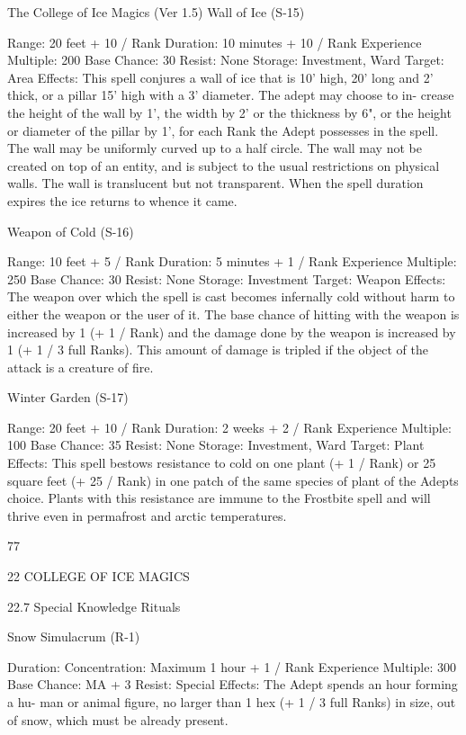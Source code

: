 \begin{Chapter}{The College of Ice Magics (Ver 1.5)}
Wall of Ice (S-15) 

Range: 20 feet + 10 / Rank 
Duration: 10 minutes + 10 / Rank 
Experience Multiple: 200 
Base Chance: 30%
Resist: None 
Storage: Investment, Ward 
Target: Area 
Effects: This spell conjures a wall of ice that is 10’ 
high,  20’  long  and  2’  thick,  or  a  pillar  15’  high 
with  a  3’  diameter.  The  adept  may  choose  to  in-
crease the height of the wall by 1’, the width by 2’ 
or the thickness by 6", or the height or diameter of 
the pillar by 1’, for each Rank the Adept possesses 
in the spell. The wall may be uniformly curved up 
to a half circle. The wall may not be created on top 
of an entity, and is subject to the usual restrictions 
on  physical  walls.  The  wall  is  translucent  but  not 
transparent. When the spell duration expires the ice 
returns to whence it came. 

Weapon of Cold (S-16) 

Range: 10 feet + 5 / Rank 
Duration: 5 minutes + 1 / Rank 
Experience Multiple: 250 
Base Chance: 30%
Resist: None 
Storage: Investment 
Target: Weapon 
Effects:  The  weapon  over  which  the  spell  is  cast 
becomes infernally cold without harm to either the 
weapon or the user of it. The base chance of hitting 
with the weapon is increased by 1 (+ 1 / Rank) and 
the  damage  done  by  the  weapon  is  increased  by  1 
(+  1  /  3  full  Ranks).  This  amount  of  damage  is 
tripled  if  the  object  of  the  attack  is  a  creature  of 
fire. 

Winter Garden (S-17) 

Range: 20 feet + 10 / Rank 
Duration: 2 weeks + 2 / Rank 
Experience Multiple: 100 
Base Chance: 35%
Resist: None 
Storage: Investment, Ward 
Target: Plant 
Effects:  This  spell  bestows  resistance  to  cold  on 
one  plant  (+  1  /  Rank)  or  25  square  feet  (+  25  / 
Rank) in one patch of the same species of plant of 
the  Adepts  choice.  Plants  with  this  resistance  are 
immune  to the  Frostbite  spell  and  will  thrive  even 
in permafrost and arctic temperatures. 

77 

22 COLLEGE OF ICE MAGICS 

22.7 Special Knowledge Rituals 

Snow Simulacrum (R-1) 

Duration:  Concentration:  Maximum  1  hour  +  1  / 
Rank 
Experience Multiple: 300 
Base Chance: MA + 3%
Resist: Special 
Effects:  The  Adept  spends  an  hour  forming  a  hu-
man or animal figure, no larger than 1 hex (+ 1 / 3 
full  Ranks)  in  size,  out  of  snow,  which  must  be 
already present.  


\end{Chapter}
